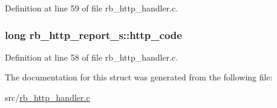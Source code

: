 Definition at line 59 of file rb\-\_\-http\-\_\-handler.\-c.

\hypertarget{structrb__http__report__s_a44a22dfbde3f5d2c5eafba73f5be2afa}{
\subsubsection[{http\-\_\-code}]{\setlength{\rightskip}{0pt plus 5cm}long rb\-\_\-http\-\_\-report\-\_\-s\-::http\-\_\-code}}\label{structrb__http__report__s_a44a22dfbde3f5d2c5eafba73f5be2afa}


Definition at line 58 of file rb\-\_\-http\-\_\-handler.\-c.



The documentation for this struct was generated from the following file\-:\begin{DoxyCompactItemize}
\item 
src/\hyperlink{rb__http__handler_8c}{rb\-\_\-http\-\_\-handler.\-c}\end{DoxyCompactItemize}

